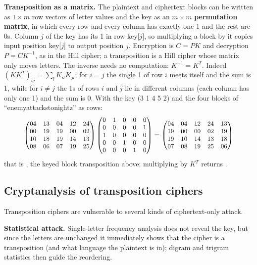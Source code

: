 \textbf{Transposition as a matrix.} The plaintext and ciphertext blocks can be written as $1 \times m$ row vectors of letter values and the key as an $m \times m$ \textbf{permutation matrix}, in which every row and every column has exactly one 1 and the rest are 0s. Column $j$ of the key has its 1 in row key[$j$], so multiplying a block by it copies input position key[$j$] to output position $j$. Encryption is $C = PK$ and decryption $P = CK^{-1}$, as in the Hill cipher; a transposition is a Hill cipher whose matrix only moves letters. The inverse needs no computation: $K^{-1} = K^{T}$. Indeed $(KK^T)_{ij} = \sum_l K_{il}K_{jl}$; for $i = j$ the single 1 of row $i$ meets itself and the sum is 1, while for $i \ne j$ the 1s of rows $i$ and $j$ lie in different columns (each column has only one 1) and the sum is 0. With the key (3 1 4 5 2) and the four blocks of ``enemyattackstonightz'' as rows:
\[
\small
\begin{pmatrix}04&13&04&12&24\\00&19&19&00&02\\10&18&19&14&13\\08&06&07&19&25\end{pmatrix}
\begin{pmatrix}0&1&0&0&0\\0&0&0&0&1\\1&0&0&0&0\\0&0&1&0&0\\0&0&0&1&0\end{pmatrix}
=
\begin{pmatrix}04&04&12&24&13\\19&00&00&02&19\\19&10&14&13&18\\07&08&19&25&06\end{pmatrix}
\]
that is , the keyed block transposition above; multiplying by $K^T$ returns .

\subsection{Cryptanalysis of transposition ciphers}
Transposition ciphers are vulnerable to several kinds of ciphertext-only attack.

\textbf{Statistical attack.} Single-letter frequency analysis does not reveal the key, but since the letters are unchanged it immediately shows that the cipher is a transposition (and what language the plaintext is in); digram and trigram statistics then guide the reordering.

